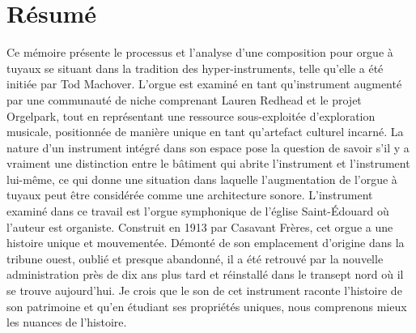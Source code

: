 \documentclass[12pt,twoside,maitrise]{dms_ks}
\theoremstyle{definition}
\begin{document}

\maketitle

\maketitle


\francais

\chapter*{Résumé}

Ce mémoire présente le processus et l'analyse d'une composition pour orgue à tuyaux se situant dans la tradition des hyper-instruments, telle qu'elle a été initiée par Tod Machover. 
L'orgue est examiné en tant qu'instrument augmenté par une communauté de niche comprenant Lauren Redhead et le projet Orgelpark, tout en représentant une ressource sous-exploitée d'exploration musicale, positionnée de manière unique en tant qu'artefact culturel incarné. 
La nature d'un instrument intégré dans son espace pose la question de savoir s'il y a vraiment une distinction entre le bâtiment qui abrite l'instrument et l'instrument lui-même, ce qui donne une situation dans laquelle l'augmentation de l'orgue à tuyaux peut être considérée comme une architecture sonore. 
L'instrument examiné dans ce travail est l'orgue symphonique de l'église Saint-Édouard où l'auteur est organiste. 
Construit en 1913 par Casavant Frères, cet orgue a une histoire unique et mouvementée. 
Démonté de son emplacement d'origine dans la tribune ouest, oublié et presque abandonné, il a été retrouvé par la nouvelle administration près de dix ans plus tard et réinstallé dans le transept nord où il se trouve aujourd'hui. 
Je crois que le son de cet instrument raconte l'histoire de son patrimoine et qu'en étudiant ses propriétés uniques, nous comprenons mieux les nuances de l'histoire. 
\end{document}
